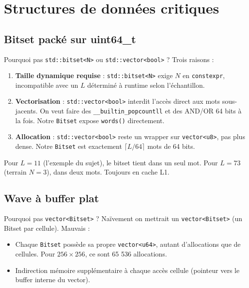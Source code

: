 \section{Structures de données critiques}
\label{sec:impl:structures}

\subsection{Bitset packé sur uint64\_t}

\begin{important}{Pourquoi pas \texttt{std::bitset<N>} ou \texttt{std::vector<bool>} ?}
Trois raisons :
\begin{enumerate}
    \item \textbf{Taille dynamique requise} : \texttt{std::bitset<N>} exige $N$ en \texttt{constexpr}, incompatible avec un $L$ déterminé à runtime selon l'échantillon.
    \item \textbf{Vectorisation} : \texttt{std::vector<bool>} interdit l'accès direct aux mots sous-jacents. On veut faire des \texttt{\_\_builtin\_popcountll} et des AND/OR 64 bits à la fois. Notre \texttt{Bitset} expose \texttt{words()} directement.
    \item \textbf{Allocation} : \texttt{std::vector<bool>} reste un wrapper sur \texttt{vector<u8>}, pas plus dense. Notre \texttt{Bitset} est exactement $\lceil L / 64 \rceil$ mots de 64 bits.
\end{enumerate}
\end{important}

Pour $L = 11$ (l'exemple du sujet), le bitset tient dans un seul mot. Pour $L = 73$ (terrain $N = 3$), dans deux mots. Toujours en cache L1.

\subsection{Wave à buffer plat}

\begin{important}{Pourquoi pas \texttt{vector<Bitset>} ?}
Naïvement on mettrait un \texttt{vector<Bitset>} (un Bitset par cellule). Mauvais :
\begin{itemize}
    \item Chaque \texttt{Bitset} possède sa propre \texttt{vector<u64>}, autant d'allocations que de cellules. Pour $256 \times 256$, ce sont 65 536 allocations.
    \item Indirection mémoire supplémentaire à chaque accès cellule (pointeur vers le buffer interne du vector).
\end{itemize}
\end{important}

